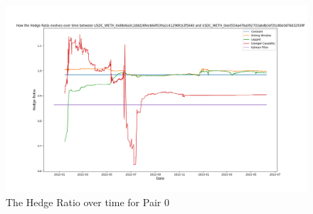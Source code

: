 \begin{figure}[H]
    \centering
    \includegraphics[width=\linewidth]{evaluation/Images/HedgeRatioPerStrat.png}
    \caption{The Hedge Ratio over time for Pair 0}
    \label{fig:HedgeRatioPerStrat}
\end{figure}

